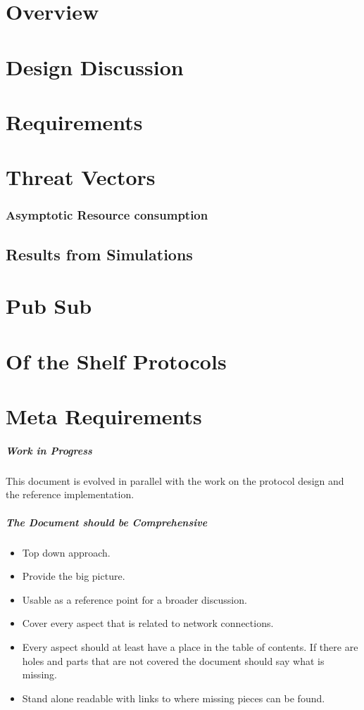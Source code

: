 \documentclass{report}
\theoremstyle{definition}{
  \newtheorem{lemma}{Lemma}[section] %
  \newtheorem{definition}[lemma]{Definition}
}
\theoremstyle{theorem}{
  \newtheorem{invariant}[lemma]{Invariant}
  \newtheorem{proofobligation}[lemma]{Proof Obligation}
}
\numberwithin{equation}{lemma}
\begin{document}
\section{Overview}
\section{Design Discussion}
\section{Requirements}
\section{Threat Vectors}
\subsubsection{Asymptotic Resource consumption}
\subsection{Results from Simulations}
\section{Pub Sub}
\section{Of the Shelf Protocols}
\section{Meta Requirements}
\subparagraph{Work in Progress}
This document is evolved in parallel with the work on the protocol design and
the reference implementation.

\subparagraph{The Document should be Comprehensive}
\begin{itemize}
\item Top down approach.
\item Provide the big picture.
\item Usable as a reference point for a broader discussion.
\item Cover every aspect that is related to network connections.
\item Every aspect should at least have a place in the table of contents.
  If there are holes and parts that are not covered the document should say what is missing.
\item Stand alone readable with links to where missing pieces can be found.
\end{itemize}
\end{document}
